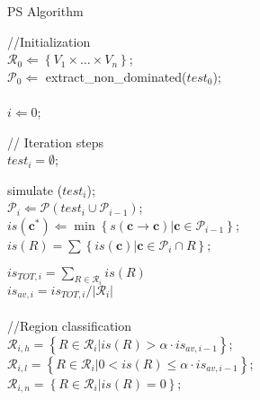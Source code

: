 \begin{algorithm}[t]
	\small
	\caption{PS Algorithm}
	\label{alg:algo}
%
	  \nl //Initialization \\
	  \nl $\mathscr{R}_0\Leftarrow
				\left\{ V_{1}\times\dots\times V_{n}\right\} $; \\
	  \nl $\mathscr{P}_0\Leftarrow $ extract\_non\_dominated($test_0$);\\
	  \nl \\
	  \nl $i\Leftarrow 0$;\\
	  \nl {} {
			// Iteration steps\\
			\nl $test_i=\emptyset$;\\
	  		\nl {}

			\nl simulate ($test_i$);\\
			\nl $\mathscr{P}_i \Leftarrow 
				\mathscr{P}\left(test_{i}\cup\mathscr{P}_{i-1}\right)$;\\
			\nl {} {
				\nl $is\left(\mathbf{c}^*\right) \Leftarrow \min\left\{ \left.s\left(\mathbf{c}\rightarrow\mathbf{c} \right)\right|\mathbf{c}\in\mathscr{P}_{i-1}\right\}$;\\
				}
			\nl {} {
				\nl $is\left(R\right)=\sum\left\{ \left.is\left(\mathbf{c}\right)\right|\mathbf{c}\in\mathscr{P}_{i}\cap R\right\} $;
			}

			\nl $is_{TOT,i}=\sum_{R\in\mathcal{R}_{i}}is\left(R\right)$ \\
			\nl $is_{av,i}=is_{TOT,i} / |\mathcal{R}_i|$\\
			\nl \\ //Region classification\\
			\nl $\mathcal{R}_{i,h}=\left\{ \left.R\in\mathcal{R}_{i}\right|is\left(R\right)>\alpha\cdot is_{av,i-1}\right\}$; \\
			\nl $\mathcal{R}_{i,l}=\left\{ \left.R\in\mathcal{R}_{i}\right|0<is\left(R\right)\le\alpha\cdot is_{av,i-1}\right\} $; \\
			\nl $\mathcal{R}_{i,n}=\left\{ \left.R\in\mathcal{R}_{i}\right|is\left(R\right)=0\right\} $;
			
}
\end{algorithm}

